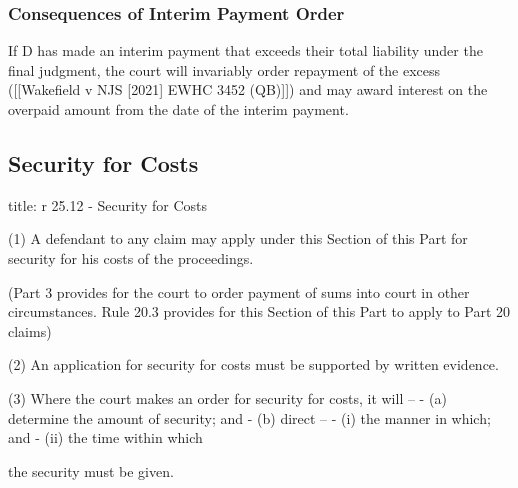 \documentclass[
]{article}
\newenvironment{Shaded}{}{}
\newcommand{\NormalTok}[1]{#1}
\begin{document}
\hypertarget{consequences-of-interim-payment-order}{%
\subsubsection{Consequences of Interim Payment
Order}\label{consequences-of-interim-payment-order}}

If D has made an interim payment that exceeds their total liability
under the final judgment, the court will invariably order repayment of
the excess ({[}{[}Wakefield v NJS {[}2021{]} EWHC 3452 (QB){]}{]}) and
may award interest on the overpaid amount from the date of the interim
payment.

\hypertarget{security-for-costs}{%
\subsection{Security for Costs}\label{security-for-costs}}

\begin{Shaded}
\begin{Highlighting}[]
\NormalTok{title: r 25.12 {-} Security for Costs}

\NormalTok{(1) A defendant to any claim may apply under this Section of this Part for security for his costs of the proceedings.}

\NormalTok{(Part 3 provides for the court to order payment of sums into court in other circumstances. Rule 20.3 provides for this Section of this Part to apply to Part 20 claims)}

\NormalTok{(2) An application for security for costs must be supported by written evidence.}

\NormalTok{(3) Where the court makes an order for security for costs, it will –}
\NormalTok{{-} (a) determine the amount of security; and}
\NormalTok{{-} (b) direct –}
\NormalTok{    {-} (i) the manner in which; and}
\NormalTok{    {-} (ii) the time within which}

\NormalTok{the security must be given.}
\end{Highlighting}
\end{Shaded}
\end{document}
